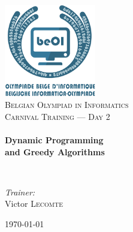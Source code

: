 \begin{titlepage}
\begin{center}

\includegraphics[width=0.3\textwidth]{./img/beoi-logo}~\\[1cm]

\textsc{\LARGE Belgian Olympiad in Informatics}\\[1.5cm]

\textsc{\Large Carnival Training --- Day 2}\\[0.5cm]

\HRule \\[0.4cm]
{ \huge \bfseries Dynamic Programming \\ and Greedy Algorithms \\[0.4cm] }

\HRule \\[1.5cm]

\begin{center} \large
\emph{Trainer:}\\
Victor \textsc{Lecomte}
\end{center}

\vfill

{\large \today}

\end{center}
\end{titlepage}
